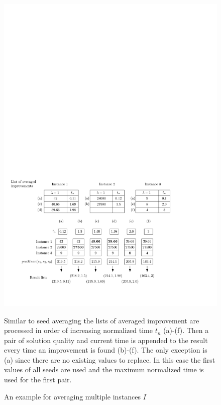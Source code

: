 \documentclass[a4paper,12pt,titlepage, BCOR7mm,headsepline]{scrbook}
\numberwithin{equation}{section}
\begin{document}
\begin{figure}[H] 
    
  \begin{center}
   \includegraphics[width=.9\textwidth]{Ipe/instanceaveragingexample.pdf}
  \caption{An example for averaging multiple instances $I$}\label{fig:averaginginstances} %
  \end{center}
Similar to seed averaging the lists of averaged improvement are processed in order of increasing normalized time $t_n$ (a)-(f). Then a pair of solution quality and current time is appended to the result every time an improvement is found (b)-(f). The only exception is (a) since there are no existing values to replace. In this case the first values of all seeds are used and the maximum normalized time is used for the first pair.
\end{figure}

\newpage
\end{document}
